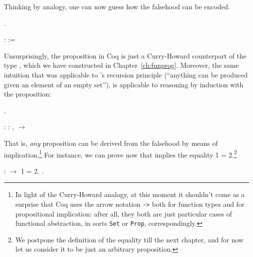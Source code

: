 Thinking by analogy, one can now guess how the falsehood can be encoded.


\begin{coqdoccode}
\coqdocemptyline
\coqdocnoindent
{} .\coqdoceol
\coqdocemptyline
\end{coqdoccode}
\coqdoceol
\coqdocemptyline
\coqdocnoindent
{}  :  :=  

\coqdocemptyline


Unsurprisingly, the proposition  in Coq is just a Curry-Howard
counterpart of the type , which we have constructed in
Chapter~\ref{ch:funprog}. Moreover, the same intuition that was
applicable to 's recursion principle (``anything can be produced
given an element of an empty set''), is applicable to reasoning by
induction with the  proposition:


\begin{coqdoccode}
\coqdocemptyline
\coqdocnoindent
{} .\coqdoceol
\coqdocemptyline
\end{coqdoccode}
\coqdoceol
\coqdocemptyline
\coqdocnoindent
{}\coqdoceol
\coqdocindent{2.50em}
: \coqdockw{\ensuremath{\forall}}  : ,  \ensuremath{\rightarrow} 

\coqdocemptyline


That is, \textit{any} proposition can be derived from the falsehood by means
of implication.\footnote{In light of the Curry-Howard analogy, at
 this moment it shouldn't come as a
surprise that Coq uses the arrow notation \texttt{->} both for
function types and for propositional implication: after all, they both
are just particular cases of functional abstraction, in sorts
\texttt{Set} or \texttt{Prop}, correspondingly.} For instance, we can
prove now that  implies the equality 1 = 2.\footnote{We
postpone the definition of the equality till the next chapter, and for
now let us consider it to be just an arbitrary proposition.}


\begin{coqdoccode}
\coqdocemptyline
\coqdocnoindent
{} :  \ensuremath{\rightarrow} 1 = 2.\coqdoceol
\coqdocnoindent
{}.\coqdoceol
\coqdocemptyline
\end{coqdoccode}


